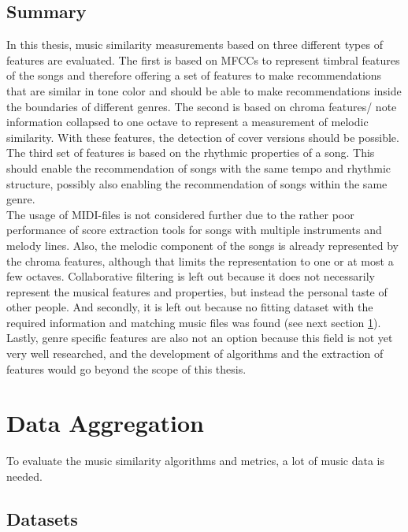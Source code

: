 \subsection{Summary}

In this thesis, music similarity measurements based on three different types of features are evaluated. 
The first is based on MFCCs to represent timbral features of the songs and therefore offering a set of features to make recommendations that are similar in tone color and should be able to make recommendations inside the boundaries of different genres.
The second is based on chroma features/ note information collapsed to one octave to represent a measurement of melodic similarity. With these features, the detection of cover versions should be possible.  
The third set of features is based on the rhythmic properties of a song. This should enable the recommendation of songs with the same tempo and rhythmic structure, possibly also enabling the recommendation of songs within the same genre.
\ \\
The usage of MIDI-files is not considered further due to the rather poor performance of score extraction tools for songs with multiple instruments and melody lines. Also, the melodic component of the songs is already represented by the chroma features, although that limits the representation to one or at most a few octaves. 
Collaborative filtering is left out because it does not necessarily represent the musical features and properties, but instead the personal taste of other people. And secondly, it is left out because no fitting dataset with the required information and matching music files was found (see next section \ref{data}). 
Lastly, genre specific features are also not an option because this field is not yet very well researched, and the development of algorithms and the extraction of features would go beyond the scope of this thesis.

\section{Data Aggregation}\label{data}

To evaluate the music similarity algorithms and metrics, a lot of music data is needed.

\subsection{Datasets}\label{datasets}

